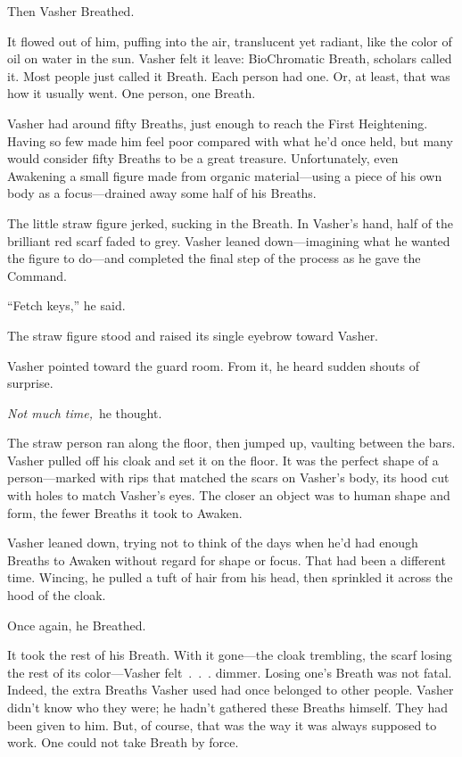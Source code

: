 Then Vasher Breathed.

It flowed out of him, puffing into the air, translucent yet radiant, like the color of oil on water in the sun. Vasher felt it leave: BioChromatic Breath, scholars called it. Most people just called it Breath. Each person had one. Or, at least, that was how it usually went. One person, one Breath.

Vasher had around fifty Breaths, just enough to reach the First Heightening. Having so few made him feel poor compared with what he’d once held, but many would consider fifty Breaths to be a great treasure. Unfortunately, even Awakening a small figure made from organic material—using a piece of his own body as a focus—drained away some half of his Breaths.

The little straw figure jerked, sucking in the Breath. In Vasher’s hand, half of the brilliant red scarf faded to grey. Vasher leaned down—imagining what he wanted the figure to do—and completed the final step of the process as he gave the Command.

“Fetch keys,” he said.

The straw figure stood and raised its single eyebrow toward Vasher.

Vasher pointed toward the guard room. From it, he heard sudden shouts of surprise.

\textit{Not much time,}~he thought.

The straw person ran along the floor, then jumped up, vaulting between the bars. Vasher pulled off his cloak and set it on the floor. It was the perfect shape of a person—marked with rips that matched the scars on Vasher’s body, its hood cut with holes to match Vasher’s eyes. The closer an object was to human shape and form, the fewer Breaths it took to Awaken.

Vasher leaned down, trying not to think of the days when he’d had enough Breaths to Awaken without regard for shape or focus. That had been a different time. Wincing, he pulled a tuft of hair from his head, then sprinkled it across the hood of the cloak.

Once again, he Breathed.

It took the rest of his Breath. With it gone—the cloak trembling, the scarf losing the rest of its color—Vasher felt~.~.~. dimmer. Losing one’s Breath was not fatal. Indeed, the extra Breaths Vasher used had once belonged to other people. Vasher didn’t know who they were; he hadn’t gathered these Breaths himself. They had been given to him. But, of course, that was the way it was always supposed to work. One could not take Breath by force.


